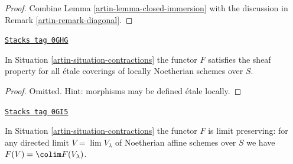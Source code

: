 \begin{proof}

Combine Lemma \ref{artin-lemma-closed-immersion}
with the discussion in Remark \ref{artin-remark-diagonal}.
\end{proof}

\begin{lemma}[Sheaf]
\label{artin-lemma-sheaf}
\href{https://stacks.math.columbia.edu/tag/0GHG}{\texttt{Stacks tag 0GHG}}

In Situation \ref{artin-situation-contractions} the functor
$F$ satisfies the sheaf property for all \'etale coverings
of locally Noetherian schemes over $S$.
\end{lemma}

\begin{proof}
Omitted. Hint: morphisms may be defined \'etale locally.
\end{proof}

\begin{lemma}
\label{artin-lemma-limit-preserving}
\href{https://stacks.math.columbia.edu/tag/0GI5}{\texttt{Stacks tag 0GI5}}

In Situation \ref{artin-situation-contractions} the functor $F$ is limit preserving:
for any directed limit $V = \lim V_\lambda$ of Noetherian affine schemes
over $S$ we have $F(V) = \colim F(V_\lambda)$.
\end{lemma}

